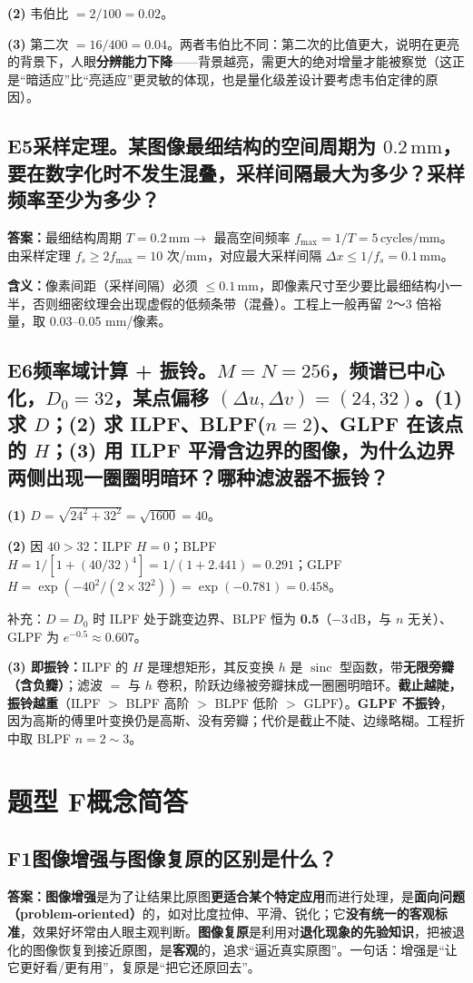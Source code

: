\textbf{(2)} 韦伯比 $=2/100=0.02$。

\textbf{(3)} 第二次 $=16/400=0.04$。两者韦伯比不同：第二次的比值更大，说明在更亮的背景下，人眼\textbf{分辨能力下降}——背景越亮，需更大的绝对增量才能被察觉（这正是“暗适应”比“亮适应”更灵敏的体现，也是量化级差设计要考虑韦伯定律的原因）。

\subsection*{E5\quad 采样定理。某图像最细结构的空间周期为 $0.2\,\mathrm{mm}$，要在数字化时不发生混叠，采样间隔最大为多少？采样频率至少为多少？}
\textbf{答案：}最细结构周期 $T=0.2\,\mathrm{mm}\to$ 最高空间频率 $f_{\max}=1/T=5\,\mathrm{cycles/mm}$。由采样定理 $f_s\geq2f_{\max}=10$ 次/mm，对应最大采样间隔 $\Delta x\leq1/f_s=0.1\,\mathrm{mm}$。

\textbf{含义：}像素间距（采样间隔）必须 $\leq0.1\,\mathrm{mm}$，即像素尺寸至少要比最细结构小一半，否则细密纹理会出现虚假的低频条带（混叠）。工程上一般再留 2～3 倍裕量，取 0.03–0.05 mm/像素。

\subsection*{E6\quad 频率域计算 + 振铃。$M=N=256$，频谱已中心化，$D_0=32$，某点偏移 $(\Delta u,\Delta v)=(24,32)$。(1) 求 $D$；(2) 求 ILPF、BLPF($n=2$)、GLPF 在该点的 $H$；(3) 用 ILPF 平滑含边界的图像，为什么边界两侧出现一圈圈明暗环？哪种滤波器不振铃？}
\textbf{(1)} $D=\sqrt{24^2+32^2}=\sqrt{1600}=40$。

\textbf{(2)} 因 $40>32$：ILPF $H=0$；BLPF $H=1/[1+(40/32)^4]=1/(1+2.441)=0.291$；GLPF $H=\exp(-40^2/(2\times32^2))=\exp(-0.781)=0.458$。

补充：$D=D_0$ 时 ILPF 处于跳变边界、BLPF 恒为 \textbf{0.5}（$-3\,\mathrm{dB}$，与 $n$ 无关）、GLPF 为 $e^{-0.5}\approx0.607$。

\textbf{(3) 即振铃：}ILPF 的 $H$ 是理想矩形，其反变换 $h$ 是 $\operatorname{sinc}$ 型函数，带\textbf{无限旁瓣（含负瓣）}；滤波 $=$ 与 $h$ 卷积，阶跃边缘被旁瓣抹成一圈圈明暗环。\textbf{截止越陡，振铃越重}（ILPF $>$ BLPF 高阶 $>$ BLPF 低阶 $>$ GLPF）。\textbf{GLPF 不振铃}，因为高斯的傅里叶变换仍是高斯、没有旁瓣；代价是截止不陡、边缘略糊。工程折中取 BLPF $n=2\sim3$。

\section*{题型 F\quad 概念简答}
\subsection*{F1\quad 图像增强与图像复原的区别是什么？}
\textbf{答案：图像增强}是为了让结果比原图\textbf{更适合某个特定应用}而进行处理，是\textbf{面向问题（problem-oriented）}的，如对比度拉伸、平滑、锐化；它\textbf{没有统一的客观标准}，效果好坏常由人眼主观判断。\textbf{图像复原}是利用对\textbf{退化现象的先验知识}，把被退化的图像恢复到接近原图，是\textbf{客观}的，追求“逼近真实原图”。一句话：增强是“让它更好看/更有用”，复原是“把它还原回去”。

